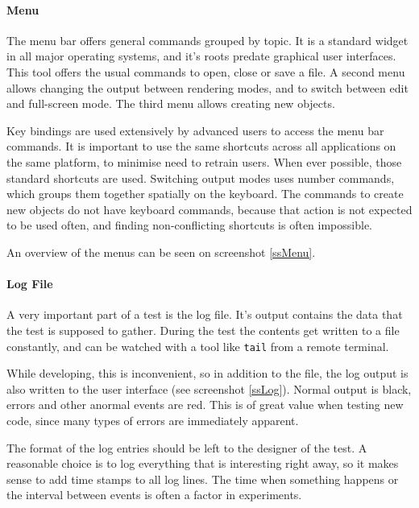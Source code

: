 \paragraph{Menu}
The menu bar offers general commands grouped by topic.
It is a standard widget in all major operating systems, and it's roots predate graphical user interfaces.
This tool offers the usual commands to open, close or save a file.
A second menu allows changing the output between rendering modes, and to switch between edit and full-screen mode.
The third menu allows creating new objects.

Key bindings are used extensively by advanced users to access the menu bar commands.
It is important to use the same shortcuts across all applications on the same platform, to minimise need to retrain users.
When ever possible, those standard shortcuts are used.
Switching output modes uses number commands, which groups them together spatially on the keyboard.
The commands to create new objects do not have keyboard commands, because that action is not expected to be used often, and finding non-conflicting shortcuts is often impossible.

An overview of the menus can be seen on screenshot \ref{ssMenu}.

\paragraph{Log File}
A very important part of a test is the log file.
It's output contains the data that the test is supposed to gather.
During the test the contents get written to a file constantly, and can be watched with a tool like \texttt{tail} from a remote terminal.

While developing, this is inconvenient, so in addition to the file, the log output is also written to the user interface (see screenshot \ref{ssLog}).
Normal output is black, errors and other anormal events are red.
This is of great value when testing new code, since many types of errors are immediately apparent.

The format of the log entries should be left to the designer of the test.
A reasonable choice is to log everything that is interesting right away, so it makes sense to add time stamps to all log lines.
The time when something happens or the interval between events is often a factor in experiments.

